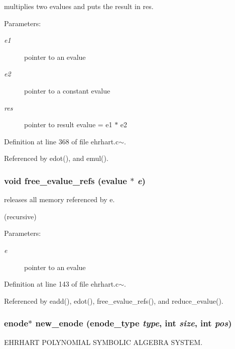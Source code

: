 multiplies two evalues and puts the result in res.

\begin{Desc}
\item[Parameters: ]\par
\begin{description}
\item[{\em 
e1}]pointer to an evalue \item[{\em 
e2}]pointer to a constant evalue \item[{\em 
res}]pointer to result evalue = e1 $\ast$ e2 \end{description}
\end{Desc}


Definition at line 368 of file ehrhart.c$\sim$.

Referenced by edot(), and emul().

\subsubsection{\setlength{\rightskip}{0pt plus 5cm}void free\_\-evalue\_\-refs (evalue $\ast$ {\em e})}\label{ehrhart_8c~_a8}


releases all memory referenced by e.

(recursive)  \begin{Desc}
\item[Parameters: ]\par
\begin{description}
\item[{\em 
e}]pointer to an evalue \end{description}
\end{Desc}


Definition at line 143 of file ehrhart.c$\sim$.

Referenced by eadd(), edot(), free\_\-evalue\_\-refs(), and reduce\_\-evalue().

\subsubsection{\setlength{\rightskip}{0pt plus 5cm}enode$\ast$ new\_\-enode (enode\_\-type {\em type}, int {\em size}, int {\em pos})}\label{ehrhart_8c~_a7}


EHRHART POLYNOMIAL SYMBOLIC ALGEBRA SYSTEM.

